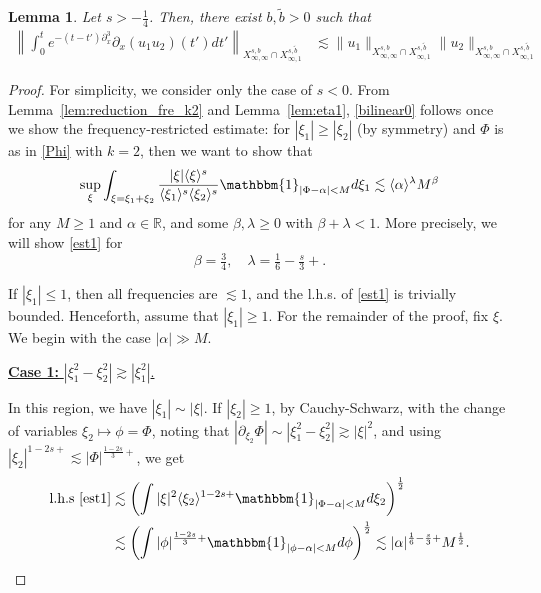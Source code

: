 \documentclass[a4paper,
11pt,  reqno]{amsart}
\newcommand{\fia}{\mathbbm{1}_{|\Phi-\alpha|<M}}
\newcommand{\jap}[1]{\langle #1 \rangle}
\newcommand{\5}{\textup{V}}
\newcommand{\noi}{\noindent}
\newcommand{\les}{\lesssim}
\newcommand{\wt}{\widetilde}
\newtheorem{lemma}[theorem]{Lemma}
\theoremstyle{remark}
\newcommand{\R}{\mathbb{R}}
\newcommand{\al}{\alpha}
\newcommand{\be}{\beta}
\newcommand{\ld}{\lambda}
\newcommand{\ges}{\gtrsim}
\numberwithin{equation}{section}
\numberwithin{theorem}{section}
\begin{document}
\begin{lemma}\label{LEM:bil0}
Let $s>-\frac14$. Then, there exist $b,\wt b >0 $ 
 such that 
\begin{align}
\label{bilinear0}
\left\|\int_0^te^{-(t-t')\partial_x^3}\partial_x(u_1u_2) (t')dt' \right\|_{X^{s,b}_{\infty, \infty}\cap X^{s,\wt{b}}_{\infty, 1} } & \les 
\|u_1\|_{X^{s,b}_{\infty, \infty}\cap X^{s,\wt{b}}_{\infty, 1} }
\|u_2\|_{X^{s,b}_{\infty, \infty}\cap X^{s,\wt{b}}_{\infty, 1} }
\end{align}
\end{lemma}



\begin{proof}


For simplicity, we consider only the case of $s<0$.
From Lemma~\ref{lem:reduction_fre_k2} and Lemma~\ref{lem:eta1}, \eqref{bilinear0} follows once we show the frequency-restricted estimate: for $|\xi_1| \ge |\xi_2|$ (by symmetry) and $\Phi$ is as in \eqref{Phi} with $k=2$, then we want to show that
\begin{equation}
\label{est1}
\sup_{\xi} \int_{\xi=\xi_1+\xi_2}
\frac{|\xi|\jap{\xi}^s}{\jap{\xi_1}^{s}\jap{\xi_2}^s}
\fia d\xi_1
\lesssim 
\jap{\al}^{\ld } M^{\be} 
\end{equation}
for any $M\ge 1$ and $\al\in\R$, and some $\be,\ld \ge 0$ with $\be+\ld < 1$. More precisely, we will show \eqref{est1} for
$$
\beta=\tfrac34,\quad \lambda=\tfrac{1}{6}-\tfrac s3+. 
$$


If $|\xi_1| \le 1$, then all frequencies are $\les1$, and the l.h.s. of \eqref{est1} is trivially bounded. Henceforth, assume that $|\xi_1| \ge 1$. 
For the remainder of the proof, fix $\xi$. We begin with the case $|\alpha|\gg M$.




\noi
\underline{\textbf{Case 1:} $|\xi_1^2-\xi_2^2| \gtrsim |\xi_1^2|$.}

In this region, we have $|\xi_1|\sim |\xi|$. If $|\xi_2|\ge 1$, by Cauchy-Schwarz, with the change of variables $\xi_2\mapsto \phi=\Phi$, noting that $|\partial_{\xi_2} \Phi|\sim |\xi_1^2 - \xi_2^2| \ges |\xi|^2$, and using $|\xi_2|^{1-2s+}\lesssim |\Phi|^{\frac{1-2s}{3}+}$, we get
\begin{align*}
\text{l.h.s \eqref{est1}}
& \les \left(\int |\xi|^2\jap{\xi_2}^{1-2s+}\fia d\xi_2\right)^\frac12\\&\lesssim \left(\int |\phi|^{\frac{1-2s}{3}+}\mathbbm{1}_{|\phi-\alpha|<M} d\phi\right)^\frac12\lesssim |\alpha|^{\frac16 - \frac s3 +} M^{\frac12}.
\end{align*}



\end{proof}
\end{document}

